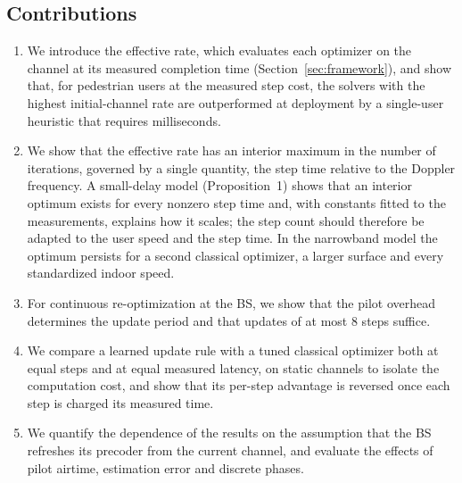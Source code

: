 \subsection{Contributions}
\begin{enumerate}
    \item We introduce the effective rate, which evaluates each optimizer on the channel at its measured completion time (Section~\ref{sec:framework}), and show that, for pedestrian users at the measured step cost, the solvers with the highest initial-channel rate are outperformed at deployment by a single-user heuristic that requires milliseconds.
    \item We show that the effective rate has an interior maximum in the number of iterations, governed by a single quantity, the step time relative to the Doppler frequency. A small-delay model (Proposition~1) shows that an interior optimum exists for every nonzero step time and, with constants fitted to the measurements, explains how it scales; the step count should therefore be adapted to the user speed and the step time. In the narrowband model the optimum persists for a second classical optimizer, a larger surface and every standardized indoor speed.
    \item For continuous re-optimization at the BS, we show that the pilot overhead determines the update period and that updates of at most 8 steps suffice.
    \item We compare a learned update rule with a tuned classical optimizer both at equal steps and at equal measured latency, on static channels to isolate the computation cost, and show that its per-step advantage is reversed once each step is charged its measured time.
    \item We quantify the dependence of the results on the assumption that the BS refreshes its precoder from the current channel, and evaluate the effects of pilot airtime, estimation error and discrete phases.
\end{enumerate}
